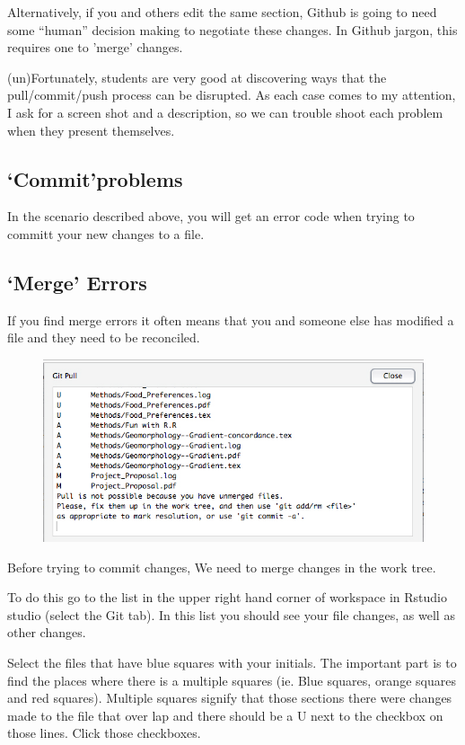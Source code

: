 \documentclass[12pt]{../SOP3_beta}
\begin{document}
\NP Alternatively, if you and others edit the same section, Github is going to need some ``human'' decision making to negotiate these changes. In Github jargon, this requires one to 'merge' changes. 

\NP (un)Fortunately, students are very good at discovering ways that the pull/commit/push process can be disrupted. As each case comes to my attention, I ask for a screen shot and a description, so we can trouble shoot each problem when they present themselves.

\subsection{`Commit'problems}
\NP In the scenario described above, you will get an error code when trying to committ your new changes to a file. 

\subsection{`Merge' Errors}

\NP If you find merge errors it often means that you and someone else has modified a file and they need to be reconciled.

\begin{figure}
\includegraphics{graphics/UnmergedError.jpg}
\end{figure}

\NP Before trying to commit changes, We need to merge changes in the work tree. 

\NP To do this go to the list in the upper right hand corner of workspace in Rstudio studio (select the Git tab). In this list you should see your file changes, as well as other changes. 

\NP Select the files that have blue squares with your initials. The important part is to find the places where there is a multiple squares (ie. Blue squares, orange squares and red squares). Multiple squares signify that those sections there were changes made to the file that over lap and there should be a U next to the checkbox on those lines. Click those checkboxes. 
\end{document}
